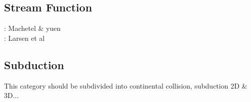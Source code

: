 \subsection{Stream Function} 
\begin{scriptsize}
\noindent
\nineteeneightynine: Machetel \& yuen \cite{mayu89} \\
\nineteenninetysix: Larsen et al \cite{laym96} \\
\end{scriptsize}



\subsection{Subduction} 
This category should be subdivided into continental collision, subduction 2D \& 3D...

